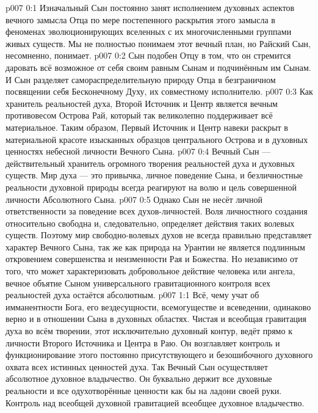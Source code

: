 \author{Божественный Советник}
\vs p007 0:1 Изначальный Сын постоянно занят исполнением духовных аспектов вечного замысла Отца по мере постепенного раскрытия этого замысла в феноменах эволюционирующих вселенных с их многочисленными группами живых существ. Мы не полностью понимаем этот вечный план, но Райский Сын, несомненно, понимает.
\vs p007 0:2 Сын подобен Отцу в том, что он стремится даровать всё возможное от себя своим равным Сынам и подчинённым им Сынам. И Сын разделяет самораспределительную природу Отца в безграничном посвящении себя Бесконечному Духу, их совместному исполнителю.
\vs p007 0:3 \pc Как хранитель реальностей духа, Второй Источник и Центр является вечным противовесом Острова Рай, который так великолепно поддерживает всё материальное. Таким образом, Первый Источник и Центр навеки раскрыт в материальной красоте изысканных образцов центрального Острова и в духовных ценностях небесной личности Вечного Сына.
\vs p007 0:4 \pc Вечный Сын --- действительный хранитель огромного творения реальностей духа и духовных существ. Мир духа --- это привычка, личное поведение Сына, и безличностные реальности духовной природы всегда реагируют на волю и цель совершенной личности Абсолютного Сына.
\vs p007 0:5 Однако Сын не несёт личной ответственности за поведение всех духов\hyp{}личностей. Воля личностного создания относительно свободна и, следовательно, определяет действия таких волевых существ. Поэтому мир свободно\hyp{}волевых духов не всегда правильно представляет характер Вечного Сына, так же как природа на Урантии не является подлинным откровением совершенства и неизменности Рая и Божества. Но независимо от того, что может характеризовать добровольное действие человека или ангела, вечное объятие Сыном универсального гравитационного контроля всех реальностей духа остаётся абсолютным.
\vs p007 1:1 Всё, чему учат об имманентности Бога, его вездесущности, всемогуществе и всеведении, одинаково верно и в отношении Сына в духовных областях. Чистая и всеобщая гравитация духа во всём творении, этот исключительно духовный контур, ведёт прямо к личности Второго Источника и Центра в Раю. Он возглавляет контроль и функционирование этого постоянно присутствующего и безошибочного духовного охвата всех истинных ценностей духа. Так Вечный Сын осуществляет абсолютное духовное владычество. Он буквально держит все духовные реальности и все одухотворённые ценности как бы на ладони своей руки. Контроль над всеобщей духовной гравитацией  всеобщее духовное владычество.

